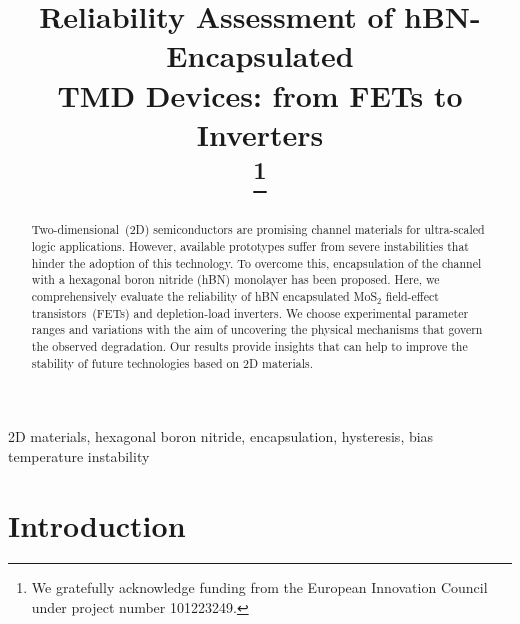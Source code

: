 \documentclass[conference]{IEEEtran}
\begin{document}
\title{Reliability Assessment of hBN-Encapsulated \\ TMD Devices: from FETs to Inverters\\
\thanks{We gratefully acknowledge funding from the European Innovation Council under project number 101223249.}
}

\author{
}

\maketitle

\begin{abstract}
Two-dimensional~(2D) semiconductors are promising channel materials for ultra-scaled logic applications. However, available prototypes suffer from severe instabilities that hinder the adoption of this technology. To overcome this, encapsulation of the channel with a hexagonal boron nitride (hBN) monolayer has been proposed. Here, we comprehensively evaluate the reliability of hBN encapsulated MoS$_2$ field-effect transistors~(FETs) and depletion-load inverters. We choose experimental parameter ranges and variations with the aim of uncovering the physical mechanisms that govern the observed degradation. Our results provide insights that can help to improve the stability of future technologies based on 2D materials. 
\end{abstract}

\begin{IEEEkeywords}
2D materials, hexagonal boron nitride, encapsulation, hysteresis, bias temperature instability
\end{IEEEkeywords}

\section{Introduction}
\end{document}
